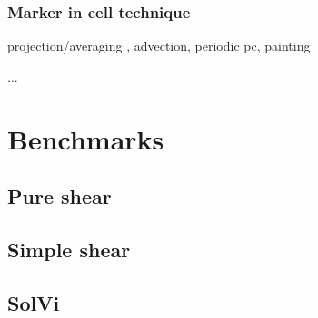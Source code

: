 \documentclass[a4paper]{article}
\begin{document}
\subsubsection{Marker in cell technique}

projection/averaging , advection, periodic pc, painting



...

\newpage
\section{Benchmarks}

\subsection{Pure shear}

\subsection{Simple shear}

\subsection{SolVi}
\end{document}
